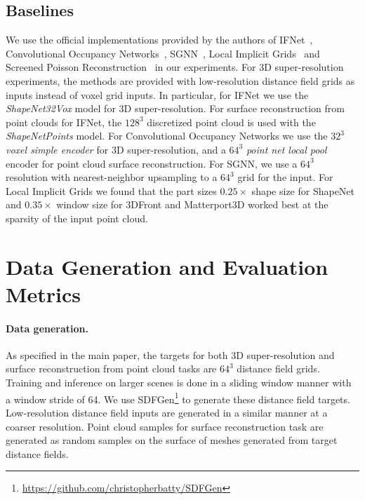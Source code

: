 \subsection{Baselines}
We use the official implementations provided by the authors of IFNet~\cite{chibane2020implicit}, Convolutional Occupancy Networks~\cite{mescheder2019occupancy}, SGNN~\cite{dai2020sg}, Local Implicit Grids~\cite{jiang2020local} and Screened Poisson Reconstruction~\cite{kazhdan2013screened} in our experiments.
%
For 3D super-resolution experiments, the methods are provided with low-resolution distance field grids as inputs instead of voxel grid inputs.
%
In particular, for IFNet we use the \textit{ShapeNet32Vox} model for 3D super-resolution.
%
For surface reconstruction from point clouds for IFNet, the $128^3$ discretized point cloud is used with the \textit{ShapeNetPoints} model.
%
For Convolutional Occupancy Networks we use the $32^3$ \textit{voxel simple encoder} for 3D super-resolution, and a $64^3$ \textit{point net local pool} encoder for point cloud surface reconstruction.
%
For SGNN, we use a $64^3$ resolution with nearest-neighbor upsampling to a $64^3$ grid for the input.
%
For Local Implicit Grids we found that the part sizes $0.25\times$ shape size for ShapeNet and $0.35\times$ window size for 3DFront and Matterport3D worked best at the sparsity of the input point cloud.


\section{Data Generation and Evaluation Metrics}
\label{sec:appendix_datagen}

\paragraph{Data generation.}
%
As specified in the main paper, the targets for both 3D super-resolution and surface reconstruction from point cloud tasks are $64^3$ distance field grids.
%
Training and inference on larger scenes is done in a sliding window manner with a window stride of 64.
%
We use SDFGen\footnote{\href{https://github.com/christopherbatty/SDFGen}{https://github.com/christopherbatty/SDFGen}} to generate these distance field targets.
%
Low-resolution distance field inputs are generated in a similar manner at a coarser resolution.
%
Point cloud samples for surface reconstruction task are generated as random samples on the surface of meshes generated from target distance fields. 
%

